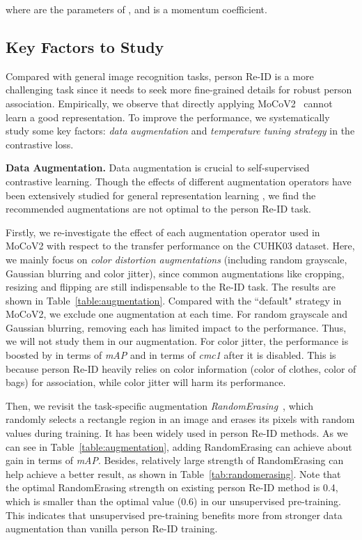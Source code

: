 \documentclass[final]{cvpr}
\newcommand{\Tref}[1]{Table~\ref{#1}}
\begin{document}
where  are the parameters of , and  is a momentum coefficient.

\subsection{Key Factors to Study}
\label{sec:key_factor}

Compared with general image recognition tasks, person Re-ID is a more challenging task since it needs to seek more fine-grained details for robust person association. Empirically, we observe that directly applying MoCoV2~\cite{chen2020improved} cannot learn a good representation. To improve the performance, we systematically study some key factors: \textit{data augmentation} and \textit{temperature tuning strategy} in the contrastive loss.

\vspace{0.5em}
\noindent\textbf{Data Augmentation.} Data augmentation is crucial to self-supervised contrastive learning. Though the effects of different augmentation operators have been extensively studied for general representation learning \cite{xie2019unsupervised,chen2020simple,he2020momentum}, we find the recommended augmentations are not optimal to the person Re-ID task.

Firstly, we re-investigate the effect of each augmentation operator used in MoCoV2 with respect to the transfer performance on the CUHK03 dataset. Here, we mainly focus on \textit{color distortion augmentations} (including random grayscale, Gaussian blurring and color jitter), since common augmentations like cropping, resizing and flipping are still indispensable to the Re-ID task. The results are shown in \Tref{table:augmentation}. Compared with the ``default" strategy in MoCoV2, we exclude one augmentation at each time. For random grayscale and Gaussian blurring, removing each has limited impact to the performance. Thus, we will not study them in our augmentation. For color jitter, the performance is boosted by  in terms of \emph{mAP} and  in terms of \emph{cmc1} after it is disabled. This is because person Re-ID heavily relies on color information (\eg color of clothes, color of bags) for association, while color jitter will harm its performance. 

Then, we revisit the task-specific augmentation \textit{RandomErasing}~\cite{zhong2020random}, which randomly selects a rectangle region in an image and erases its pixels with random values during training. It has been widely used in person Re-ID methods. As we can see in \Tref{table:augmentation}, adding  RandomErasing can achieve about  gain in terms of \emph{mAP}. Besides, relatively large strength of RandomErasing can help achieve a better result, as shown in \Tref{tab:randomerasing}. Note that the optimal RandomErasing strength on existing person Re-ID method is 0.4, which is smaller than the optimal value (0.6) in our unsupervised pre-training. This indicates that unsupervised pre-training benefits more from stronger data augmentation than vanilla person Re-ID training.
\end{document}
